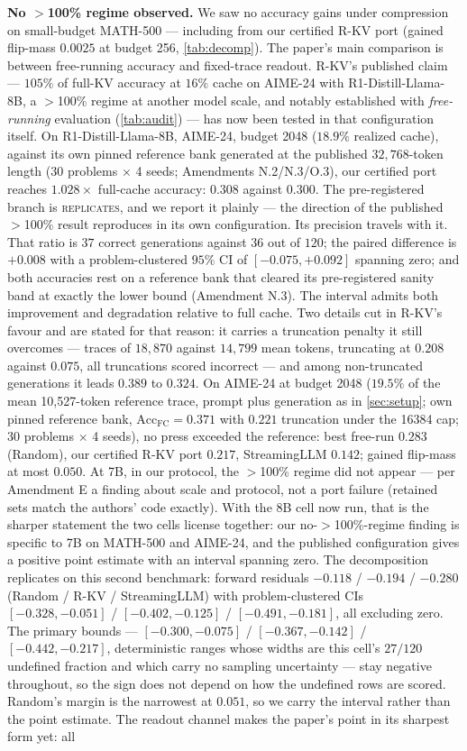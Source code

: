 \documentclass{article}
\newcommand{\accfc}{\mathrm{Acc}_{\mathrm{FC}}}
\begin{document}
\textbf{No $>$100\% regime observed.} We saw no accuracy gains under compression on small-budget MATH-500 --- including from our certified R-KV port (gained flip-mass $0.0025$ at budget 256, \cref{tab:decomp}). The paper's main comparison is between free-running accuracy and fixed-trace readout. R-KV's published claim --- $105\%$ of full-KV accuracy at $16\%$ cache on AIME-24 with R1-Distill-Llama-8B, a $>$100\% regime at another model scale, and notably established with \emph{free-running} evaluation (\cref{tab:audit}) --- has now been tested in that configuration itself. On R1-Distill-Llama-8B, AIME-24, budget 2048 ($18.9\%$ realized cache), against its own pinned reference bank generated at the published $32{,}768$-token length (30 problems $\times$ 4 seeds; Amendments N.2/N.3/O.3), our certified port reaches $1.028\times$ full-cache accuracy: $0.308$ against $0.300$. The pre-registered branch is \textsc{replicates}, and we report it plainly --- the direction of the published $>$100\% result reproduces in its own configuration. Its precision travels with it. That ratio is $37$ correct generations against $36$ out of $120$; the paired difference is $+0.008$ with a problem-clustered $95\%$ CI of $[-0.075, +0.092]$ spanning zero; and both accuracies rest on a reference bank that cleared its pre-registered sanity band at exactly the lower bound (Amendment N.3). The interval admits both improvement and degradation relative to full cache. Two details cut in R-KV's favour and are stated for that reason: it carries a truncation penalty it still overcomes --- traces of $18{,}870$ against $14{,}799$ mean tokens, truncating at $0.208$ against $0.075$, all truncations scored incorrect --- and among non-truncated generations it leads $0.389$ to $0.324$. On AIME-24 at budget 2048 ($19.5\%$ of the mean 10{,}527-token reference trace, prompt plus generation as in \cref{sec:setup}; own pinned reference bank, $\accfc = 0.371$ with $0.221$ truncation under the 16384 cap; 30 problems $\times$ 4 seeds), no press exceeded the reference: best free-run $0.283$ (Random), our certified R-KV port $0.217$, StreamingLLM $0.142$; gained flip-mass at most $0.050$. At 7B, in our protocol, the $>$100\% regime did not appear --- per Amendment E a finding about scale and protocol, not a port failure (retained sets match the authors' code exactly). With the 8B cell now run, that is the sharper statement the two cells license together: our no-$>$100\%-regime finding is specific to 7B on MATH-500 and AIME-24, and the published configuration gives a positive point estimate with an interval spanning zero. The decomposition replicates on this second benchmark: forward residuals $-0.118$ / $-0.194$ / $-0.280$ (Random / R-KV / StreamingLLM) with problem-clustered CIs $[-0.328, -0.051]$ / $[-0.402, -0.125]$ / $[-0.491, -0.181]$, all excluding zero. The primary bounds --- $[-0.300, -0.075]$ / $[-0.367, -0.142]$ / $[-0.442, -0.217]$, deterministic ranges whose widths are this cell's $27/120$ undefined fraction and which carry no sampling uncertainty --- stay negative throughout, so the sign does not depend on how the undefined rows are scored. Random's margin is the narrowest at $0.051$, so we carry the interval rather than the point estimate. The readout channel makes the paper's point in its sharpest form yet: all 
\end{document}
